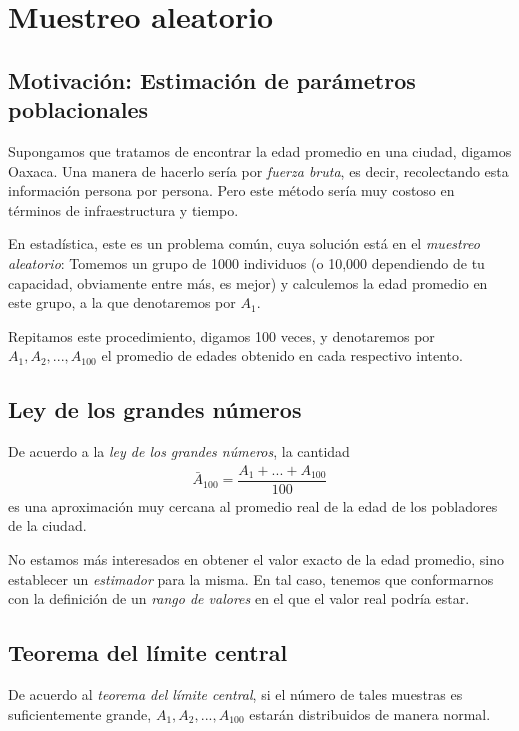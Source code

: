 \section{Muestreo aleatorio}

\subsection{Motivación: Estimación de parámetros poblacionales}

Supongamos que tratamos de encontrar la edad promedio en una ciudad, digamos Oaxaca. Una manera de hacerlo sería por \emph{fuerza bruta}, es decir, recolectando esta información persona por persona. Pero este método sería muy costoso en términos de infraestructura y tiempo.

En estadística, este es un problema común, cuya solución está en el \emph{muestreo aleatorio}: Tomemos un grupo de 1000 individuos (o 10,000 dependiendo de tu capacidad, obviamente entre más, es mejor) y calculemos la edad promedio en este grupo, a la que denotaremos por $A_{1}.$

Repitamos este procedimiento, digamos 100 veces, y denotaremos por $A_{1}, A_{2},...,A_{100}$ el promedio de edades obtenido en cada respectivo intento.

\subsection{Ley de los grandes números}

De acuerdo a la \emph{ley de los grandes números}, la cantidad
\begin{align}
	\bar{A}_{100}=\dfrac{A_{1}+...+A_{100}}{100}
\end{align}
es una aproximación muy cercana al promedio real de la edad de los pobladores de la ciudad.

\begin{observacion}
	No estamos más interesados en obtener el valor exacto de la edad promedio, sino establecer un \emph{estimador} para la misma. En tal caso, tenemos que conformarnos con la definición de un \emph{rango de valores} en el que el valor real podría estar.
\end{observacion}

\subsection{Teorema del límite central}

De acuerdo al \emph{teorema del límite central}, si el número de tales muestras es suficientemente grande, $A_{1},A_{2},...,A_{100}$ estarán distribuidos de manera normal.

